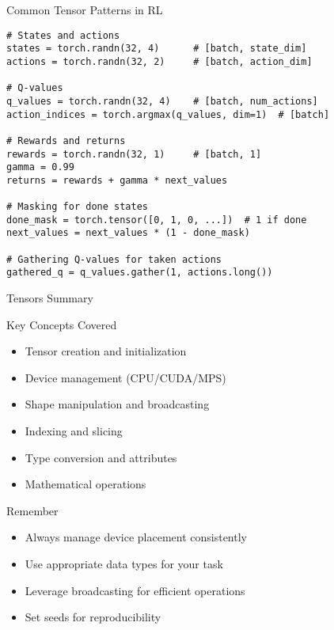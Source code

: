 \documentclass[aspectratio=169,10pt]{beamer}
\begin{document}
\begin{frame}[fragile]{Common Tensor Patterns in RL}
\begin{lstlisting}
# States and actions
states = torch.randn(32, 4)      # [batch, state_dim]
actions = torch.randn(32, 2)     # [batch, action_dim]

# Q-values
q_values = torch.randn(32, 4)    # [batch, num_actions]
action_indices = torch.argmax(q_values, dim=1)  # [batch]

# Rewards and returns
rewards = torch.randn(32, 1)     # [batch, 1]
gamma = 0.99
returns = rewards + gamma * next_values

# Masking for done states
done_mask = torch.tensor([0, 1, 0, ...])  # 1 if done
next_values = next_values * (1 - done_mask)

# Gathering Q-values for taken actions
gathered_q = q_values.gather(1, actions.long())
\end{lstlisting}
\end{frame}

\begin{frame}{Tensors Summary}
\begin{block}{Key Concepts Covered}
\begin{itemize}
    \item Tensor creation and initialization
    \item Device management (CPU/CUDA/MPS)
    \item Shape manipulation and broadcasting
    \item Indexing and slicing
    \item Type conversion and attributes
    \item Mathematical operations
\end{itemize}
\end{block}

\begin{alertblock}{Remember}
\begin{itemize}
    \item Always manage device placement consistently
    \item Use appropriate data types for your task
    \item Leverage broadcasting for efficient operations
    \item Set seeds for reproducibility
\end{itemize}
\end{alertblock}
\end{frame}
\end{document}

